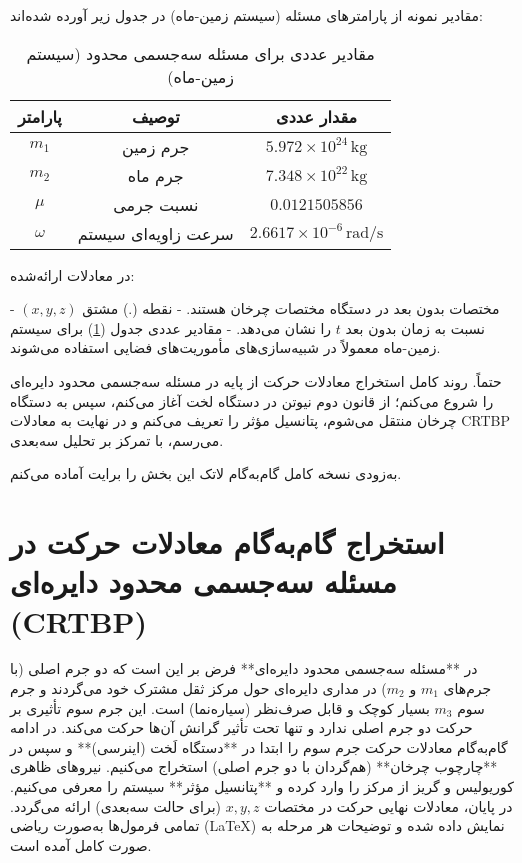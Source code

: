 مقادیر نمونه از پارامترهای مسئله (سیستم زمین-ماه) در جدول زیر آورده شده‌اند:

\begin{table}[H]
	\centering
	\caption{مقادیر عددی برای مسئله سه‌جسمی محدود (سیستم زمین-ماه)}
	\begin{tabular}{|c|c|c|}
		\hline
		پارامتر & توصیف & مقدار عددی \\
		\hline
		$m_1$ & جرم زمین & $5.972 \times 10^{24}\,\mathrm{kg}$ \\
		$m_2$ & جرم ماه & $7.348 \times 10^{22}\,\mathrm{kg}$ \\
		$\mu$ & نسبت جرمی & $0.0121505856$ \\
		$\omega$ & سرعت زاویه‌ای سیستم & $2.6617 \times 10^{-6}\,\mathrm{rad/s}$ \\
		\hline
	\end{tabular}
	\label{tab:params}
\end{table}

در معادلات ارائه‌شده:

- $(x,y,z)$ مختصات بدون بعد در دستگاه مختصات چرخان هستند.
- نقطه (.) مشتق نسبت به زمان بدون بعد $t$ را نشان می‌دهد.
- مقادیر عددی جدول (\ref{tab:params}) برای سیستم زمین-ماه معمولاً در شبیه‌سازی‌های مأموریت‌های فضایی استفاده می‌شوند.















حتماً. روند کامل استخراج معادلات حرکت از پایه در مسئله سه‌جسمی محدود دایره‌ای را شروع می‌کنم؛ از قانون دوم نیوتن در دستگاه لخت آغاز می‌کنم، سپس به دستگاه چرخان منتقل می‌شوم، پتانسیل مؤثر را تعریف می‌کنم و در نهایت به معادلات CRTBP می‌رسم، با تمرکز بر تحلیل سه‌بعدی.

به‌زودی نسخه کامل گام‌به‌گام لاتک این بخش را برایت آماده می‌کنم.

\section{ استخراج گام‌به‌گام معادلات حرکت در مسئله سه‌جسمی محدود دایره‌ای (CRTBP) }

در **مسئله سه‌جسمی محدود دایره‌ای** فرض بر این است که دو جرم اصلی (با جرم‌های \(m_1\) و \(m_2\)) در مداری دایره‌ای حول مرکز ثقل مشترک خود می‌گردند و جرم سوم \(m_3\) بسیار کوچک و قابل صرف‌نظر (سیاره‌نما) است. این جرم سوم تأثیری بر حرکت دو جرم اصلی ندارد و تنها تحت تأثیر گرانش آن‌ها حرکت می‌کند. در ادامه گام‌به‌گام معادلات حرکت جرم سوم را ابتدا در **دستگاه لَخت (اینرسی)** و سپس در **چارچوب چرخان** (هم‌گردان با دو جرم اصلی) استخراج می‌کنیم. نیروهای ظاهری کوریولیس و گریز از مرکز را وارد کرده و **پتانسیل مؤثر** سیستم را معرفی می‌کنیم. در پایان، معادلات نهایی حرکت در مختصات \(x, y, z\) (برای حالت سه‌بعدی) ارائه می‌گردد. تمامی فرمول‌ها به‌صورت ریاضی (LaTeX) نمایش داده شده و توضیحات هر مرحله به صورت کامل آمده است.

